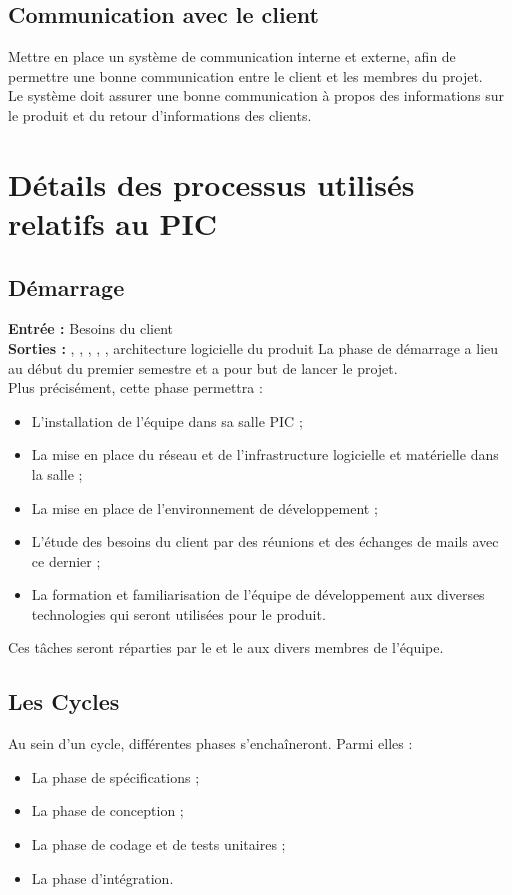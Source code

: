 \subsection{Communication avec le client}

Mettre en place un système de communication interne et externe, afin de permettre une bonne communication entre le client et les membres du projet.\\
 Le système doit assurer une bonne communication à propos des informations sur le produit et du retour d’informations des clients.

\section{Détails des processus utilisés relatifs au PIC}

\subsection{Démarrage}

\textbf{Entrée :} Besoins du client \\
\textbf{Sorties :} \DSECourt , \DSICourt , \PTUCourt , \PTICourt , \PTVCourt , architecture logicielle du produit
La phase de démarrage a lieu au début du premier semestre et a pour but de lancer le projet. \\
Plus précisément, cette phase permettra :
\begin{itemize}


\item L’installation de l’équipe dans sa salle PIC ;
\item  La mise en place du réseau et de l’infrastructure logicielle et matérielle dans la salle ;
\item La mise en place de l’environnement de développement ;
\item  L’étude des besoins du client par des réunions et des échanges de mails avec ce dernier ;
\item La formation et familiarisation de l’équipe de développement aux diverses technologies qui seront utilisées pour le produit.
\end{itemize}
Ces tâches seront réparties par le \CP et le \CPA{} aux divers membres de l’équipe.

\subsection{Les Cycles}
Au sein d’un cycle, différentes phases s’enchaîneront. Parmi elles :
\begin{itemize}
\item La phase de spécifications ;
\item La phase de conception ;
\item La phase de codage et de tests unitaires ;
\item La phase d’intégration.
\end{itemize}

